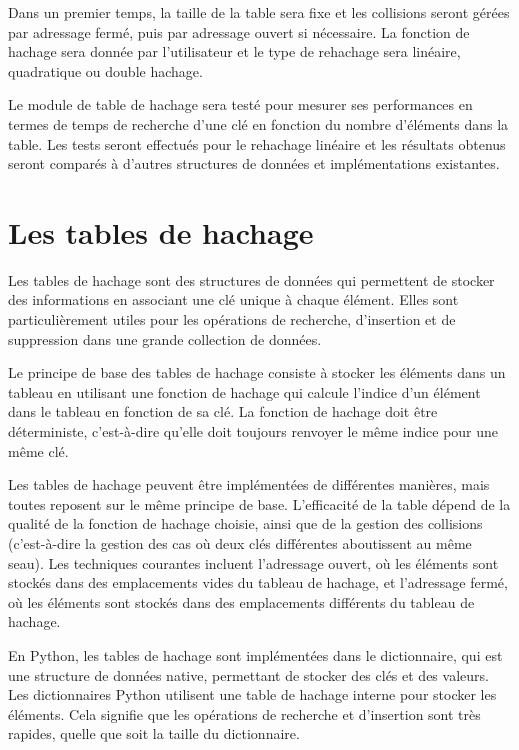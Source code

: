 \documentclass{article}
\begin{document}
    Dans un premier temps, la taille de la table sera fixe et les collisions seront gérées par adressage fermé, puis par adressage ouvert si nécessaire.
    La fonction de hachage sera donnée par l'utilisateur et le type de rehachage sera linéaire, quadratique ou double hachage.

    Le module de table de hachage sera testé pour mesurer ses performances en termes de temps de recherche d'une clé en fonction du nombre d'éléments dans la table.
    Les tests seront effectués pour le rehachage linéaire et les résultats obtenus seront comparés à d'autres structures de données et implémentations existantes.

    \section{Les tables de hachage}\label{sec:hachtable}

    Les tables de hachage sont des structures de données qui permettent de stocker des informations en associant une clé unique à chaque élément.
    Elles sont particulièrement utiles pour les opérations de recherche, d'insertion et de suppression dans une grande collection de données.

    Le principe de base des tables de hachage consiste à stocker les éléments dans un tableau en utilisant une fonction de hachage qui calcule l'indice d'un élément dans le tableau en fonction de sa clé.
    La fonction de hachage doit être déterministe, c'est-à-dire qu'elle doit toujours renvoyer le même indice pour une même clé.

    Les tables de hachage peuvent être implémentées de différentes manières, mais toutes reposent sur le même principe de base.
    L'efficacité de la table dépend de la qualité de la fonction de hachage choisie, ainsi que de la gestion des collisions (c'est-à-dire la gestion des cas où deux clés différentes aboutissent au même seau).
    Les techniques courantes incluent l'adressage ouvert, où les éléments sont stockés dans des emplacements vides du tableau de hachage, et l'adressage fermé, où les éléments sont stockés dans des emplacements différents du tableau de hachage.

    En Python, les tables de hachage sont implémentées dans le dictionnaire, qui est une structure de données native, permettant de stocker des clés et des valeurs.
    Les dictionnaires Python utilisent une table de hachage interne pour stocker les éléments.
    Cela signifie que les opérations de recherche et d'insertion sont très rapides, quelle que soit la taille du dictionnaire.
\end{document}
